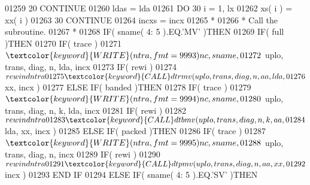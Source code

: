 \begin{DoxyCode}
01259    20                   \textcolor{keywordflow}{CONTINUE}
01260                         ldas = lda
01261                         \textcolor{keywordflow}{DO} 30 i = 1, lx
01262                            xs( i ) = xx( i )
01263    30                   \textcolor{keywordflow}{CONTINUE}
01264                         incxs = incx
01265 \textcolor{comment}{*}
01266 \textcolor{comment}{*                       Call the subroutine.}
01267 \textcolor{comment}{*}
01268                         \textcolor{keywordflow}{IF}( sname( 4: 5 ).EQ.\textcolor{stringliteral}{'MV'} )\textcolor{keywordflow}{THEN}
01269                            \textcolor{keywordflow}{IF}( full )\textcolor{keywordflow}{THEN}
01270                               \textcolor{keywordflow}{IF}( trace )
01271      $                           \textcolor{keyword}{WRITE}( ntra, fmt = 9993 )nc, sname,
01272      $                           uplo, trans, diag, n, lda, incx
01273                               \textcolor{keywordflow}{IF}( rewi )
01274      $                           rewind ntra
01275                               \textcolor{keyword}{CALL }dtrmv( uplo, trans, diag, n, aa, lda,
01276      $                                    xx, incx )
01277                            \textcolor{keywordflow}{ELSE} \textcolor{keywordflow}{IF}( banded )\textcolor{keywordflow}{THEN}
01278                               \textcolor{keywordflow}{IF}( trace )
01279      $                           \textcolor{keyword}{WRITE}( ntra, fmt = 9994 )nc, sname,
01280      $                           uplo, trans, diag, n, k, lda, incx
01281                               \textcolor{keywordflow}{IF}( rewi )
01282      $                           rewind ntra
01283                               \textcolor{keyword}{CALL }dtbmv( uplo, trans, diag, n, k, aa,
01284      $                                    lda, xx, incx )
01285                            \textcolor{keywordflow}{ELSE} \textcolor{keywordflow}{IF}( packed )\textcolor{keywordflow}{THEN}
01286                               \textcolor{keywordflow}{IF}( trace )
01287      $                           \textcolor{keyword}{WRITE}( ntra, fmt = 9995 )nc, sname,
01288      $                           uplo, trans, diag, n, incx
01289                               \textcolor{keywordflow}{IF}( rewi )
01290      $                           rewind ntra
01291                               \textcolor{keyword}{CALL }dtpmv( uplo, trans, diag, n, aa, xx,
01292      $                                    incx )
01293 \textcolor{keywordflow}{                           END IF}
01294                         \textcolor{keywordflow}{ELSE} \textcolor{keywordflow}{IF}( sname( 4: 5 ).EQ.\textcolor{stringliteral}{'SV'} )\textcolor{keywordflow}{THEN}

\end{DoxyCode}
